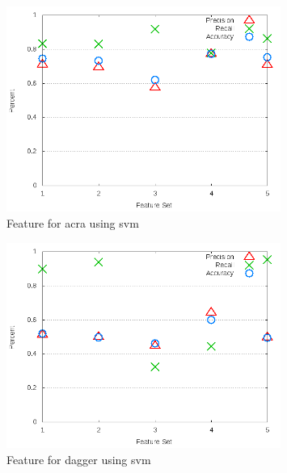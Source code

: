 \begin{figure}[!t]
    \centering

        \includegraphics[width=0.8\textwidth]{images/svm/test_3/acra_sample_range}
        \caption{Feature for acra using \gls{svm}}
        \label{fig:test_3_acra_svm}
\end{figure}

\begin{figure}[!ht]
    \centering
        \includegraphics[width=0.8\textwidth]{images/svm/test_3/dagger_sample_range}
        \caption{Feature for dagger using \gls{svm}}
        \label{fig:test_3_dagger_svm}
\end{figure}



